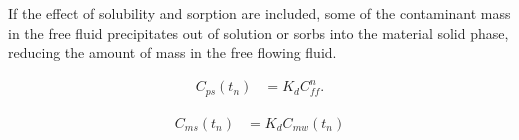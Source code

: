 If the effect of solubility and sorption are included, some of the contaminant 
mass in the free fluid precipitates out of solution or sorbs into the material 
solid phase, reducing the amount of mass in the free flowing fluid. 

\begin{align}
C_{ps}(t_n) &= K_dC_{ff}^n.
\end{align}


\begin{align}
C_{ms}(t_n) &= K_d C_{mw}(t_n) 
\end{align}


